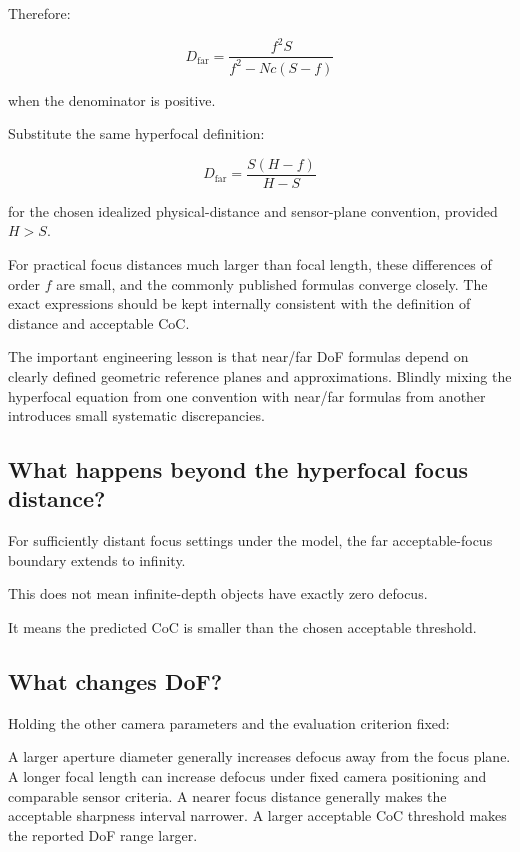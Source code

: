 Therefore:

\[ \boxed{ D_{\mathrm{far}} = \frac{f^2S}{f^2-Nc(S-f)} } \]

when the denominator is positive.

Substitute the same hyperfocal definition:

\[ \boxed{ D_{\mathrm{far}} = \frac{S(H-f)}{H-S} } \]

for the chosen idealized physical-distance and sensor-plane convention, provided \(H>S\).

For practical focus distances much larger than focal length, these differences of order \(f\) are small, and the commonly published formulas converge closely. The exact expressions should be kept internally consistent with the definition of distance and acceptable CoC.

The important engineering lesson is that near/far DoF formulas depend on clearly defined geometric reference planes and approximations. Blindly mixing the hyperfocal equation from one convention with near/far formulas from another introduces small systematic discrepancies.

\subsection{What happens beyond the hyperfocal focus distance?}\label{02-foundations-ii-ch036-what-happens-beyond-the-hyperfocal-focus-distance}

For sufficiently distant focus settings under the model, the far acceptable-focus boundary extends to infinity.

This does not mean infinite-depth objects have exactly zero defocus.

It means the predicted CoC is smaller than the chosen acceptable threshold.

\subsection{What changes DoF?}\label{02-foundations-ii-ch036-what-changes-dof}

Holding the other camera parameters and the evaluation criterion fixed:

A larger aperture diameter generally increases defocus away from the focus plane. A longer focal length can increase defocus under fixed camera positioning and comparable sensor criteria. A nearer focus distance generally makes the acceptable sharpness interval narrower. A larger acceptable CoC threshold makes the reported DoF range larger.

